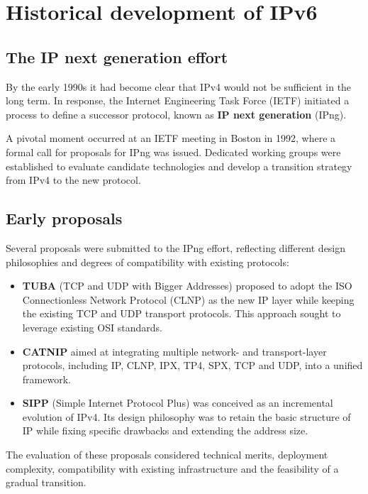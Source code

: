 \section{Historical development of IPv6}

\subsection{The IP next generation effort}

By the early 1990s it had become clear that IPv4 would not be sufficient in the long term. In response, the Internet Engineering Task Force (IETF) initiated a process to define a successor protocol, known as \textbf{IP next generation} (IPng).

A pivotal moment occurred at an IETF meeting in Boston in 1992, where a formal call for proposals for IPng was issued. Dedicated working groups were established to evaluate candidate technologies and develop a transition strategy from IPv4 to the new protocol.

\subsection{Early proposals}

Several proposals were submitted to the IPng effort, reflecting different design philosophies and degrees of compatibility with existing protocols:

\begin{itemize}
\item \textbf{TUBA} (TCP and UDP with Bigger Addresses) proposed to adopt the ISO Connectionless Network Protocol (CLNP) as the new IP layer while keeping the existing TCP and UDP transport protocols. This approach sought to leverage existing OSI standards.
\item \textbf{CATNIP} aimed at integrating multiple network- and transport-layer protocols, including IP, CLNP, IPX, TP4, SPX, TCP and UDP, into a unified framework.
\item \textbf{SIPP} (Simple Internet Protocol Plus) was conceived as an incremental evolution of IPv4. Its design philosophy was to retain the basic structure of IP while fixing specific drawbacks and extending the address size.
\end{itemize}

The evaluation of these proposals considered technical merits, deployment complexity, compatibility with existing infrastructure and the feasibility of a gradual transition.

